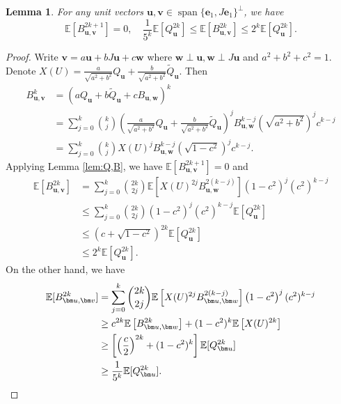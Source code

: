 \documentclass{amsart}
\theoremstyle{plain}
\newtheorem{lemma}{Lemma}
\theoremstyle{definition}
\theoremstyle{remark}
\newcommand{\EE}{\mathbb{E}}
\begin{document}
\begin{lemma}
\label{lem:B-ineq}
    For any unit vectors $\bm u,\bm v\in\operatorname{span}\{\bm e_1,J\bm e_1\}^\perp$,  we have 
    \begin{equation}
       \EE[B_{\bm u,\bm v}^{2k+1}]=0, \quad \frac{1}{5^{k}}\EE[Q_{\bm u}^{2k}]\leq \EE[B_{\bm u,\bm v}^{2k}]\leq {2^k}\EE[Q_{\bm u}^{2k}]. 
    \end{equation}
    
\end{lemma}
\begin{proof}
   Write $\bm v=a\bm u+bJ\bm u+c\bm w$ where $\bm w\perp \bm u,\bm w\perp J\bm u$ and $a^2+b^2+c^2=1$. Denote $X(U)=\frac{a}{\sqrt{a^2+b^2}}Q_{\bm u}+\frac{b}{\sqrt{a^2+b^2}}\tilde Q_{\bm u}$.  Then  
   \begin{align*}
       B_{\bm u,\bm v}^k&=(aQ_{\bm u}+b\tilde Q_{\bm u}+cB_{\bm u,\bm w})^k\\
       &=\sum\limits_{j=0}^k\binom{k}{j}\left(\frac{a}{\sqrt{a^2+b^2}}Q_{\bm u}+\frac{b}{\sqrt{a^2+b^2}}\tilde Q_{\bm u}\right)^jB_{\bm u,\bm w}^{k-j} \left(\sqrt{a^2+b^2}\right)^jc^{k-j}\\
       &=\sum\limits_{j=0}^k\binom{k}{j}X(U)^jB_{\bm u,\bm w}^{k-j}\left(\sqrt{1-c^2}\right)^jc^{k-j}.
   \end{align*}
   Applying Lemma \ref{lem:Q,B}, we have $\EE[B_{\bm u,\bm v}^{2k+1}]=0$ and
   \begin{align*}
       \EE[B_{\bm u,\bm v}^{2k}]&=\sum\limits_{j=0}^k\binom{2k}{2j}\EE\left[X(U)^{2j}B_{\bm u,\bm w}^{2(k-j)}\right]\left({1-c^2}\right)^j(c^2)^{k-j}\\
       &\leq \sum\limits_{j=0}^k\binom{2k}{2j}\left({1-c^2}\right)^j(c^2)^{k-j}\EE[Q_{\bm u}^{2k}]\\
       &\leq \left(c+\sqrt{1-c^2}\right)^{2k}\EE[Q_{\bm u}^{2k}]\\
       &\leq 2^k\EE[Q_{\bm u}^{2k}].
   \end{align*}
   On the other hand, we have
\begin{align*}
    \EE[B_{\bm u,\bm v}^{2k}]&=\sum\limits_{j=0}^k\binom{2k}{2j}\EE\left[X(U)^{2j}B_{\bm u,\bm w}^{2(k-j)}\right]\left({1-c^2}\right)^j(c^2)^{k-j}\\
    &\geq c^{2k}\EE\left[B_{\bm u,\bm w}^{2k}\right]+(1-c^2)^k\EE\left[X(U)^{2k}\right]\\
    &\geq \left[\left(\frac{c}{2}\right)^{2k}+(1-c^2)^k\right]\EE[Q_{\bm u}^{2k}]\\
    &\geq \frac{1}{5^k}\EE[Q_{\bm u}^{2k}]. \qedhere
\end{align*} 
\end{proof}
\end{document}
